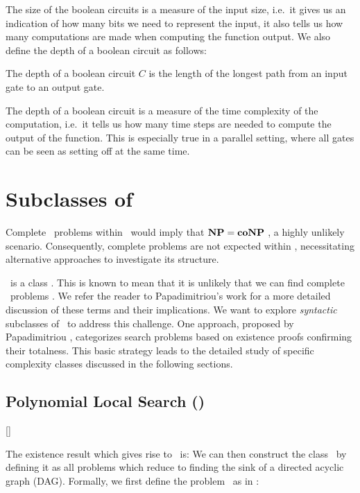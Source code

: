 The size of the boolean circuits is a measure of the input size, i.e.\ it gives us an indication of how many bits we need to represent the input, it also tells us how many computations are made when computing the function output. We also define the depth of a boolean circuit as follows:

\begin{definition}
	The depth of a boolean circuit $C$ is the length of the longest path from an input gate to an output gate.
\end{definition}

The depth of a boolean circuit is a measure of the time complexity of the computation, i.e.\ it tells us how many time steps are needed to compute the output of the function. This is especially true in a parallel setting, where all gates can be seen as setting off at the same time.

\section{Subclasses of \TFNP}

Complete \FNP\ problems within \TFNP\ would imply that $\textbf{NP} = \textbf{coNP}$ , a highly unlikely scenario. Consequently, complete problems are not expected within \TFNP, necessitating alternative approaches to investigate its structure.

\TFNP\ is a  class . This is known to mean that it is unlikely that we can find complete \TFNP\ problems . We refer the reader to Papadimitriou's work  for a more detailed discussion of these terms and their implications. We want to explore \textit{syntactic} subclasses of \TFNP\ to address this challenge. One approach, proposed by Papadimitriou \cite{papadimitriou_computational_1994}, categorizes search problems based on existence proofs confirming their totalness. This basic strategy leads to the detailed study of specific complexity classes discussed in the following sections.

\subsection{Polynomial Local Search (\PLS)}[\PLS]

The existence result which gives rise to \PLS\ is:
We can then construct the class \PLS\ by defining it as all problems which reduce to finding the sink of a directed acyclic graph (DAG). Formally, we first define the problem \Localopt\ as in :

